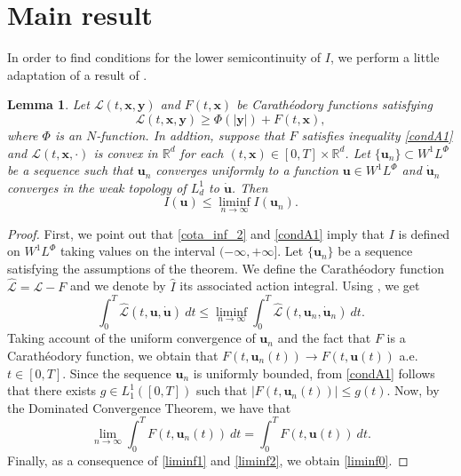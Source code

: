 \documentclass[twoside]{elsarticle}
\newtheorem{lem}[thm]{Lemma}
\theoremstyle{remark}
\newcommand{\lphi}{L^{\Phi}}
\newcommand{\wphi}{W^{1}\lphi}
\renewcommand{\b}[1]{\boldsymbol{#1}}
\newcommand{\rr}{\mathbb{R}}
\renewcommand{\leq}{\leqslant}
\begin{document}
\section{Main result}\label{sec:main}


In order to find conditions for the lower semicontinuity of  $I$, 
we perform a little adaptation of  a result of \cite{ekeland1999convex}. 



\begin{lem}\label{semicontinf}
Let $\mathcal{L}(t,\b{x},\b{y})$ and $F(t,\b{x})$ be  Carath\'eodory functions satisfying
\begin{equation}\label{cota_inf_2}
\mathcal{L}(t,\b{x},\b{y})\geq \Phi\left(|\b{y}|\right)+ F(t,\b{x}),
\end{equation}
where $\Phi$ is an $N$-function. 
In addtion, suppose that $F$ satisfies inequality \eqref{condA1} and $\mathcal{L}(t,\b{x},\cdot)$ is convex in $\rr^d$ for each $(t,\b{x})\in [0,T]\times\rr^d$.  Let $\{\b{u}_n\}\subset\wphi$ be a sequence such that $\b{u}_n$ converges  uniformly  to a function $\b{u}\in\wphi$ and $\b{\dot{u}}_n$ converges in the weak topology of $L^1_d$ to $\b{\dot{u}}$.   Then
\begin{equation}\label{liminf0}I(\b{u})\leq \liminf_{n\to\infty}I(\b{u}_n).
\end{equation}

\end{lem}

\begin{proof} First, we point out that \eqref{cota_inf_2} and \eqref{condA1} imply that $I$ is defined on $\wphi$ taking values on the interval $(-\infty,+\infty]$. 
Let $\{\b{u}_n\}$ be a sequence  satisfying the assumptions of the theorem.   We define the Carath\'eodory function $\mathcal{\hat{L}}=\mathcal{L}-F$ and we denote by $\hat{I}$ its  associated action integral. Using  \cite[Thm. 2.1, p. 243]{ekeland1999convex}, we get
\begin{equation}\label{liminf1}
\int_0^T\mathcal{\hat{L}}(t,\b{u},\b{\dot{u}})\ dt\leq \liminf_{n\to\infty}\int_0^T\mathcal{\hat{L}}(t,\b{u}_n,\b{\dot{u}}_n)\ dt.
\end{equation}
Taking account of the uniform convergence of $\b{u}_n$ and the fact that  $F$  is a  Carath\'eodory function,  we obtain that $F(t,\b{u}_n(t))\to F(t,\b{u}(t))$ a.e. $t\in[0,T]$.  Since the sequence $\b{u}_n$ is uniformly bounded, from \eqref{condA1} follows that there exists $g\in L_1^1([0,T])$ such that $|F(t,\b{u}_n(t))|\leq g(t)$. Now, by the Dominated Convergence Theorem, we have that 
\begin{equation}\label{liminf2}
\lim_{n\to\infty}\int_0^TF(t,\b{u}_n(t))\ dt=\int_0^TF(t,\b{u}(t))\ dt.
\end{equation}
Finally, as a consequence of  \eqref{liminf1} and  \eqref{liminf2}, we obtain \eqref{liminf0}.

\end{proof}
\end{document}
